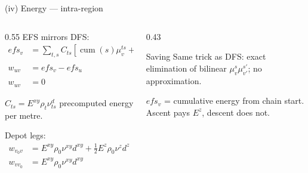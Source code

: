 \documentclass[aspectratio=169,10pt]{beamer}
\begin{document}
\begin{frame}{(iv) Energy — intra-region}
  \begin{columns}[T,onlytextwidth]
    \begin{column}{0.55\textwidth}
      {\small EFS mirrors DFS:}
      {\footnotesize
      \begin{align*}
        efs_v &=\sum_{t,s}C_{ts}[\operatorname{cum}(s)\mu_v^{ts}+L(s)\eta_v^{ts}] \tag{EFS}\\
        w_{uv} &=efs_v-efs_u &&\!(u,v)\in\mathcal{E}_{RL}^{int} \tag{$w$-C$_1$}\\
        w_{uv} &=0 &&\!(u,v)\in\mathcal{E}_{LR}^{int} \tag{$w$-C$_2$}
      \end{align*}}
      {\scriptsize $C_{ts}=E^{xy}\rho_t\nu_{ts}^d$ precomputed energy per metre. \par}
      \vspace{0.08cm}
      {\small Depot legs:}
      {\footnotesize
      \begin{align*}
        w_{v_0v} &= E^{xy}\rho_0\nu^{xy}d^{xy}+\tfrac12 E^{z}\rho_0\nu^{z}d^{z}\\
        w_{vv_0} &= E^{xy}\rho_0\nu^{xy}d^{xy} \tag{no recuperation}
      \end{align*}}
    \end{column}
    \begin{column}{0.43\textwidth}
      \centering
      \begin{block}{Saving}
        {\scriptsize Same trick as DFS: exact elimination of bilinear $\mu_v^s\mu_{v'}^{s'}$; no approximation.}
      \end{block}
      \vspace{0.12cm}
      {\scriptsize $efs_v$ = cumulative energy from chain start. Ascent pays $E^{z}$, descent does not.}
    \end{column}
  \end{columns}
\end{frame}
\end{document}
